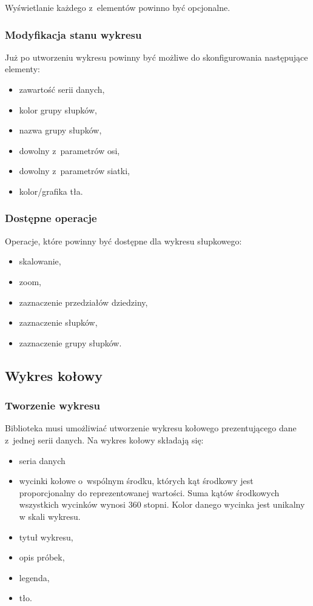 \documentclass[11pt,twoside,a4paper,final]{article}
\begin{document}
Wyświetlanie każdego z~elementów powinno być opcjonalne. 
\subsubsection{Modyfikacja stanu wykresu}
Już po utworzeniu wykresu powinny być możliwe do skonfigurowania następujące elementy:
\begin{itemize}
\item{zawartość serii danych,}
\item{kolor grupy słupków,}
\item{nazwa grupy słupków,}
\item{dowolny z~parametrów osi,}
\item{dowolny z~parametrów siatki,}
\item{kolor/grafika tła.}
\end{itemize}

\subsubsection{Dostępne operacje}
Operacje, które powinny być dostępne dla wykresu słupkowego:
\begin{itemize}
\item{skalowanie,}
\item{zoom,}
\item{zaznaczenie przedziałów dziedziny,}
\item{zaznaczenie słupków,}
\item{zaznaczenie grupy słupków.}
\end{itemize}


\subsection{Wykres kołowy}
\subsubsection{Tworzenie wykresu}
Biblioteka musi umożliwiać utworzenie wykresu kołowego prezentującego dane z~jednej serii danych. Na wykres kołowy składają się:
\begin{itemize}
\item{seria danych}
\item{wycinki kołowe o~wspólnym środku, których kąt środkowy jest proporcjonalny do reprezentowanej wartości. Suma kątów środkowych wszystkich wycinków wynosi 360 stopni. Kolor danego wycinka jest unikalny w skali wykresu.}
\item{tytuł wykresu,}
\item{opis próbek,}
\item{legenda,}
\item{tło.}
\end{itemize}
\end{document}
